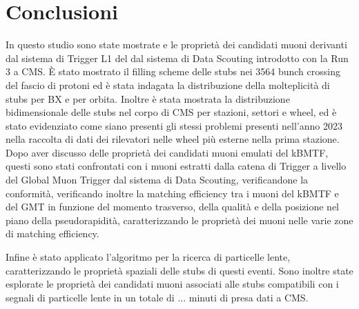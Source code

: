 \chapter{Conclusioni}
\label{cap:Conclusioni}

In questo studio sono state mostrate e le proprietà dei candidati muoni derivanti dal sistema di Trigger L1 del dal sistema di Data Scouting introdotto con la Run 3 a CMS. È stato mostrato il filling scheme delle stubs nei 3564 bunch crossing del fascio di protoni ed è stata indagata la distribuzione della molteplicità di stubs per BX e per orbita. Inoltre è stata mostrata la distribuzione bidimensionale delle stubs nel corpo di CMS per stazioni, settori e wheel, ed è stato evidenziato come siano presenti gli stessi problemi presenti nell'anno 2023 nella raccolta di dati dei rilevatori nelle wheel più esterne nella prima stazione. \newline
Dopo aver discusso delle proprietà dei candidati muoni emulati del kBMTF, questi sono stati confrontati con i muoni estratti dalla catena di Trigger a livello del Global Muon Trigger dal sistema di Data Scouting, verificandone la conformità, verificando inoltre la matching efficiency tra i muoni del kBMTF e del GMT in funzione del momento trasverso, della qualità e della posizione nel piano della pseudorapidità, caratterizzando le proprietà dei muoni nelle varie zone di matching efficiency.

Infine è stato applicato l'algoritmo per la ricerca di particelle lente, caratterizzando le proprietà spaziali delle stubs di questi eventi. Sono inoltre state esplorate le proprietà dei candidati muoni associati alle stubs compatibili con i segnali di particelle lente in un totale di ... minuti di presa dati a CMS.